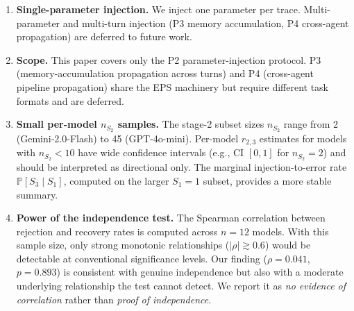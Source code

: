 \documentclass{article}
\renewcommand{\Pr}{\mathbb{P}}
\begin{document}
\begin{enumerate}
  \item \textbf{Single-parameter injection.}
    We inject one parameter per trace.
    Multi-parameter and multi-turn injection (P3 memory accumulation,
    P4 cross-agent propagation) are deferred to future work.

  \item \textbf{Scope.}
    This paper covers only the P2 parameter-injection protocol.
    P3 (memory-accumulation propagation across turns) and P4
    (cross-agent pipeline propagation) share the EPS machinery but
    require different task formats and are deferred.

  \item \textbf{Small per-model $n_{S_2}$ samples.}
    The stage-2 subset sizes $n_{S_2}$ range from 2 (Gemini-2.0-Flash)
    to 45 (GPT-4o-mini).
    Per-model $r_{2,3}$ estimates for models with $n_{S_2} < 10$ have
    wide confidence intervals (e.g., CI $[0, 1]$ for $n_{S_2}{=}2$)
    and should be interpreted as directional only.
    The marginal injection-to-error rate $\Pr[S_3 \mid S_1]$, computed
    on the larger $S_1{=}1$ subset, provides a more stable summary.

  \item \textbf{Power of the independence test.}
    The Spearman correlation between rejection and recovery rates is
    computed across $n{=}12$ models.
    With this sample size, only strong monotonic relationships
    ($|\rho| \gtrsim 0.6$) would be detectable at conventional significance
    levels.
    Our finding ($\rho{=}0.041$, $p{=}0.893$) is consistent with
    genuine independence but also with a moderate underlying relationship
    the test cannot detect.
    We report it as \emph{no evidence of correlation} rather than
    \emph{proof of independence}.
\end{enumerate}
\end{document}
